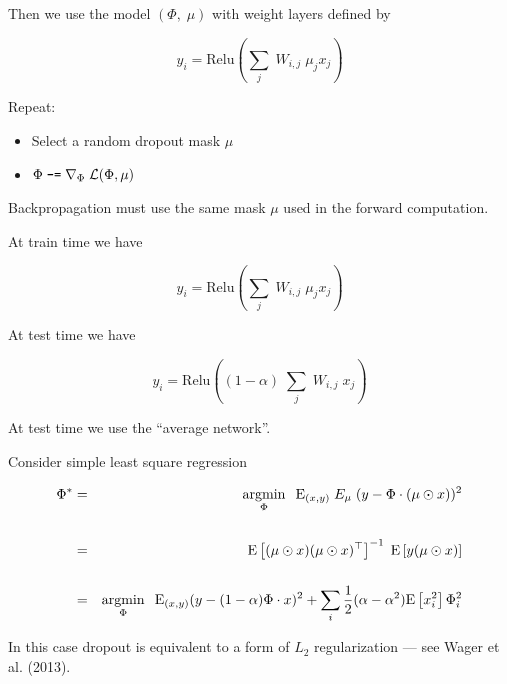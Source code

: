 {\vfill
Then we use the model $(\Phi,\;\mu)$ with weight layers defined by


\vfill
$$y_i = \mathrm{Relu}\left(\sum_j\;W_{i,j} \;\mu_jx_j\right)$$


Repeat:

\vfill

\begin{itemize}
\item Select a random dropout mask $\mu$
  
\vfill
\item $\Phi \;\mbox{\tt -=}\; \nabla_\Phi\; {\cal L}(\Phi, \mu)$
\end{itemize}

\vfill
Backpropagation must use the same mask $\mu$ used in the forward computation.



\vfill
At train time we have

\vfill
$$y_i = \mathrm{Relu}\left(\sum_j\;W_{i,j} \;\mu_j x_j\right)$$


\vfill
At test time we have

\vfill
$$y_i = \mathrm{Relu}\left((1-\alpha)\;\sum_j\;W_{i,j} \;x_j\right)$$

\vfill
At test time we use the ``average network''.


Consider simple least square regression

\begin{eqnarray*}
  \Phi^* & = &  \operatorname*{argmin}_\Phi\;\; \mathrm{E}_{(x,y)} \;E_{\mu}\;(y - \Phi \cdot (\mu \odot x))^2 \\
  \\
  & = & \mathrm{E}\left[(\mu\odot x)(\mu\odot x)^{\top}\right]^{-1}\; \mathrm{E}\left[y (\mu\odot x)\right] \\
  \\
  & = & \operatorname*{argmin}_\Phi\;\; \mathrm{E}_{(x,y)} (y - (1-\alpha) \Phi \cdot x)^2 + \sum_i\frac{1}{2}(\alpha - \alpha^2) \mathrm{E}\left[x_i^2\right] \Phi_i^2
\end{eqnarray*}

\vfill
In this case dropout is equivalent to a form of $L_2$ regularization --- see Wager et al. (2013).

}

